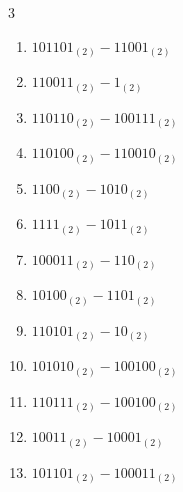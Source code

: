 \begin{multicols}{3}
\begin{enumerate}

\columnbreak %

\resetques

  \item $101101_{(2)} - 11001_{(2)}$


  \item $110011_{(2)} - 1_{(2)}$


  \item $110110_{(2)} - 100111_{(2)}$


  \item $110100_{(2)} - 110010_{(2)}$


  \item $1100_{(2)} - 1010_{(2)}$


  \item $1111_{(2)} - 1011_{(2)}$


  \item $100011_{(2)} - 110_{(2)}$


  \item $10100_{(2)} - 1101_{(2)}$


  \item $110101_{(2)} - 10_{(2)}$


  \item $101010_{(2)} - 100100_{(2)}$


\columnbreak %

  \item $110111_{(2)} - 100100_{(2)}$


  \item $10011_{(2)} - 10001_{(2)}$


  \item $101101_{(2)} - 100011_{(2)}$


\end{enumerate}
\end{multicols}
